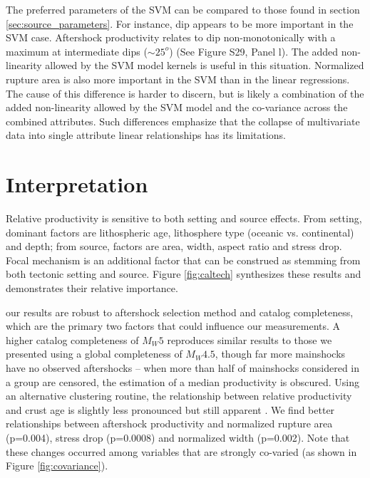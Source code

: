 \documentclass[draft, jgrga]{agujournal2018}
\begin{document}
The preferred parameters of the SVM can be compared to those found in section \ref{sec:source_parameters}. For instance, dip appears to be more important in the SVM case. Aftershock productivity relates to dip non-monotonically with a maximum at intermediate  dips ($\sim 25^o$) (See Figure S29, Panel l). The added non-linearity allowed by the SVM model kernels is useful in this situation. Normalized rupture area is also more important in the SVM than in the linear regressions. The cause of this difference is harder to discern, but is likely a combination of the added non-linearity allowed by the SVM model and the co-variance across the combined attributes. Such differences emphasize that the collapse of multivariate data into single attribute linear relationships has its limitations.

\section{Interpretation}
    
Relative productivity is sensitive to both setting and source effects. From setting, dominant factors are lithospheric age, lithosphere type (oceanic vs. continental) and depth; from source, factors are area, width, aspect ratio and stress drop. Focal mechanism is an additional factor that can be construed as stemming from both tectonic setting and source. Figure \ref{fig:caltech}  synthesizes these results and demonstrates their relative importance. 

 our results are robust to aftershock selection method and catalog completeness, which are the primary two factors that could influence our measurements. A higher catalog completeness of $M_W5$ reproduces similar results to those we presented using a global completeness of $M_W4.5$, though far more mainshocks have no observed aftershocks  -- when more than half of mainshocks considered in a group are censored, the estimation of a median productivity is obscured. Using an alternative clustering routine, the relationship between relative productivity and crust age is slightly less pronounced but still apparent . We find better relationships between aftershock productivity and normalized rupture area (p=0.004), stress drop (p=0.0008) and normalized width (p=0.002). Note that these changes occurred among variables that are strongly co-varied (as shown in Figure \ref{fig:covariance}). 
\end{document}
